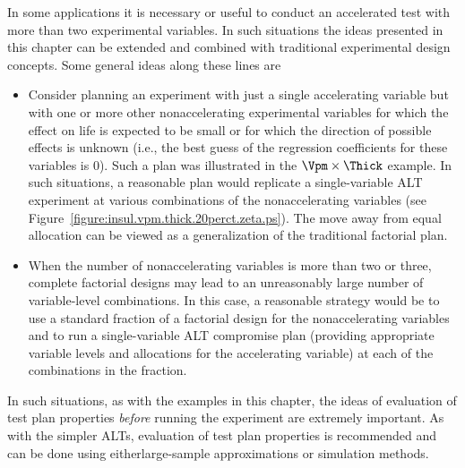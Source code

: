 In some applications it is necessary or useful to conduct an
accelerated test with more than two experimental variables.  In such
situations the ideas presented in this chapter can be extended and
combined with traditional experimental design concepts.  Some
general ideas along these lines are

\begin{itemize}
\item
Consider planning an experiment with just a single accelerating
variable but with one or more other nonaccelerating experimental
variables for which the effect on life is expected to be small or
for which the direction of possible effects is unknown (i.e., the
best guess of the regression coefficients for these variables is
0). Such a plan was illustrated in the $\Vpm \times \Thick$
example. In such situations, a reasonable plan would replicate a
single-variable ALT experiment at various combinations of the
nonaccelerating variables (see
Figure~\ref{figure:insul.vpm.thick.20perct.zeta.ps}). The move away
from equal allocation can be viewed as a generalization of the
traditional factorial plan.
\item
When the number of nonaccelerating variables is more than two or three,
complete factorial designs may lead to an unreasonably large number
of variable-level combinations. In this case, a reasonable strategy
would be to use a standard
fraction of a factorial design for the nonaccelerating variables and to
run a single-variable ALT compromise plan (providing appropriate
variable levels and allocations for the accelerating variable) at each
of the combinations in the fraction.
\end{itemize}

In such situations, as with the examples in this chapter, the ideas
of evaluation of test plan properties {\em before} running the
experiment are extremely important. As with the simpler ALTs,
evaluation of test plan properties is recommended
and can be done  using eitherlarge-sample approximations or
simulation methods.


